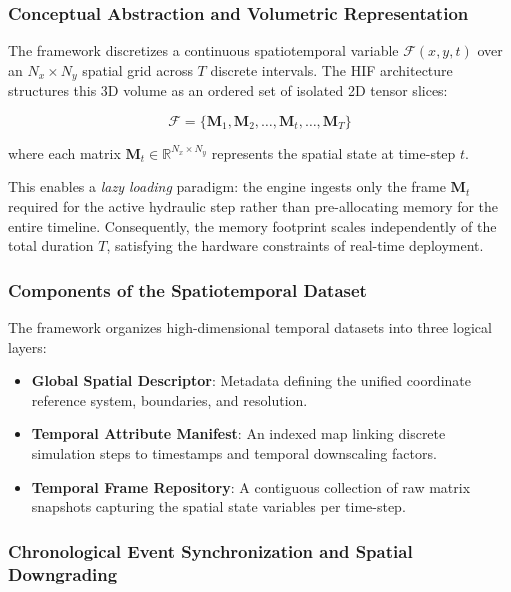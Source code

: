 \subsubsection{Conceptual Abstraction and Volumetric Representation}
\label{subsub:conceptual_abstraction}

The framework discretizes a continuous spatiotemporal variable $\mathcal{F}(x, y, t)$ over an $N_x \times N_y$ spatial grid across $T$ discrete intervals. The HIF architecture structures this 3D volume as an ordered set of isolated 2D tensor slices:

\begin{equation}
    \mathcal{F} = \{ \mathbf{M}_1, \mathbf{M}_2, \dots, \mathbf{M}_t, \dots, \mathbf{M}_T \}
\end{equation}

where each matrix $\mathbf{M}_t \in \mathbb{R}^{N_x \times N_y}$ represents the spatial state at time-step $t$. 

This enables a \textsl{lazy loading} paradigm: the engine ingests only the frame $\mathbf{M}_t$ required for the active hydraulic step rather than pre-allocating memory for the entire timeline. Consequently, the memory footprint scales independently of the total duration $T$, satisfying the hardware constraints of real-time deployment.

\subsubsection{Components of the Spatiotemporal Dataset}

The framework organizes high-dimensional temporal datasets into three logical layers:

\begin{itemize}
    \item \textbf{Global Spatial Descriptor}: Metadata defining the unified coordinate reference system, boundaries, and resolution.
    \item \textbf{Temporal Attribute Manifest}: An indexed map linking discrete simulation steps to timestamps and temporal downscaling factors.
    \item \textbf{Temporal Frame Repository}: A contiguous collection of raw matrix snapshots capturing the spatial state variables per time-step.
\end{itemize}

\subsubsection{Chronological Event Synchronization and Spatial Downgrading}
\label{subsub:chronological_synchronization}

